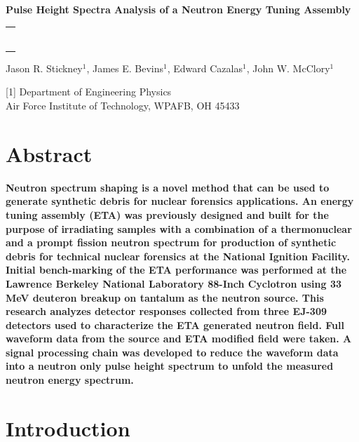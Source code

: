 \documentclass[twocolumn,10pt,final]{asme2ej}
\begin{document}
\begin{center}

\textbf{\large{Pulse Height Spectra Analysis of a Neutron Energy Tuning Assembly}}

\noindent
\begin{tabular}{l}
\rule{3.2in}{0.02in}
\end{tabular}

{Jason R. Stickney$^1$, James E. Bevins$^1$, Edward Cazalas$^1$, John W. McClory$^1$}
\vspace{0.1in}

{[1] Department of Engineering Physics\\
	Air Force Institute of Technology,	WPAFB, OH 45433\\}

\end{center}

\vspace{-0.5 cm}
\section*{Abstract}
\textbf{
Neutron spectrum shaping is a novel method that can be used to generate synthetic debris for nuclear forensics applications.  
An energy tuning assembly (ETA) was previously designed and built for the purpose of irradiating samples with a combination of a thermonuclear and a prompt fission neutron spectrum for production of synthetic debris for technical nuclear forensics at the National Ignition Facility. 
Initial bench-marking of the ETA performance was performed at the Lawrence Berkeley National Laboratory 88-Inch Cyclotron using 33 MeV deuteron breakup on tantalum as the neutron source.  
This research analyzes detector responses collected from three EJ-309 detectors used to characterize the ETA generated neutron field.   
Full waveform data from the source and ETA modified field were taken.  
A signal processing chain was developed to reduce the waveform data into a neutron only pulse height spectrum to unfold the measured neutron energy spectrum.}


\vspace{-0.4 cm}
\section{Introduction} \label{intro}
\end{document}

